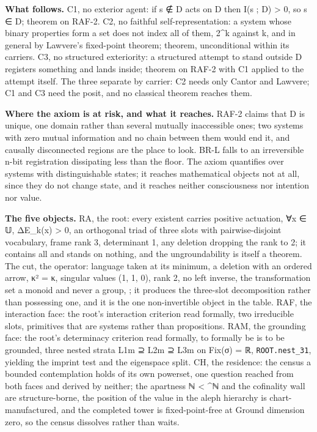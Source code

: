 \documentclass[10pt,twocolumn]{article}
\begin{document}
\textbf{What follows.} C1, no exterior agent: if s ∉ D acts on D then
I(s ; D) \textgreater{} 0, so s ∈ D; theorem on RAF-2. C2, no faithful
self-representation: a system whose binary properties form a set does
not index all of them, 2\^{}k against k, and in general by Lawvere's
fixed-point theorem; theorem, unconditional within its carriers. C3, no
structured exteriority: a structured attempt to stand outside D
registers something and lands inside; theorem on RAF-2 with C1 applied
to the attempt itself. The three separate by carrier: C2 needs only
Cantor and Lawvere; C1 and C3 need the posit, and no classical theorem
reaches them.

\textbf{Where the axiom is at risk, and what it reaches.} RAF-2 claims
that D is unique, one domain rather than several mutually inaccessible
ones; two systems with zero mutual information and no chain between them
would end it, and causally disconnected regions are the place to look.
BR-L falls to an irreversible n-bit registration dissipating less than
the floor. The axiom quantifies over systems with distinguishable
states; it reaches mathematical objects not at all, since they do not
change state, and it reaches neither consciousness nor intention nor
value.

\textbf{The five objects.} RA, the root: every existent carries positive
actuation, ∀x ∈ 𝕌, ΔE\_k(x) \textgreater{} 0, an orthogonal triad of
three slots with pairwise-disjoint vocabulary, frame rank 3, determinant
1, any deletion dropping the rank to 2; it contains all and stands on
nothing, and the ungroundability is itself a theorem. The cut, the
operator: language taken at its minimum, a deletion with an ordered
arrow, κ² = κ, singular values (1, 1, 0), rank 2, no left inverse, the
transformation set a monoid and never a group,
\texttt{}; it produces the three-slot
decomposition rather than possessing one, and it is the one
non-invertible object in the table. RAF, the interaction face: the
root's interaction criterion read formally, two irreducible slots,
primitives that are systems rather than propositions. RAM, the grounding
face: the root's determinacy criterion read formally, to formally be is
to be grounded, three nested strata L1m ⊇ L2m ⊇ L3m on Fix(σ) = ℝ,
\texttt{ROOT.nest\_31}, yielding the imprint test and the eigenspace
split. CH, the residence: the census a bounded contemplation holds of
its own powerset, one question reached from both faces and derived by
neither; the apartness \textbar ℕ\textbar{} \textless{}
\^{}ℕ\textbar{} and the cofinality wall are structure-borne,
the position of the value in the aleph hierarchy is chart-manufactured,
and the completed tower is fixed-point-free at Ground dimension zero, so
the census dissolves rather than waits.
\end{document}
